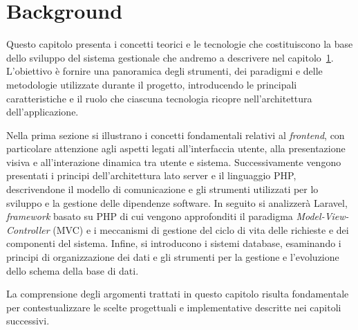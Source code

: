 \chapter{Background}
\label{ch:background}
Questo capitolo presenta i concetti teorici e le tecnologie che costituiscono la base dello sviluppo del sistema gestionale che andremo a descrivere nel capitolo~\ref{ch:background}. L'obiettivo è fornire una panoramica degli strumenti, dei paradigmi e delle metodologie utilizzate durante il progetto, introducendo le principali caratteristiche e il ruolo che ciascuna tecnologia ricopre nell'architettura dell'applicazione.

Nella prima sezione si illustrano i concetti fondamentali relativi al \textit{frontend}, con particolare attenzione agli aspetti legati all'interfaccia utente, alla presentazione visiva e all'interazione dinamica tra utente e sistema. Successivamente vengono presentati i principi dell'architettura lato server e il linguaggio PHP, descrivendone il modello di comunicazione e gli strumenti utilizzati per lo sviluppo e la gestione delle dipendenze software.
In seguito si analizzerà Laravel, \textit{framework} basato su PHP di cui vengono approfonditi il paradigma \textit{Model-View-Controller} (MVC) e i meccanismi di gestione del ciclo di vita delle richieste e dei componenti del sistema. Infine, si introducono i sistemi database, esaminando i principi di organizzazione dei dati e gli strumenti per la gestione e l'evoluzione dello schema della base di dati.

La comprensione degli argomenti trattati in questo capitolo risulta fondamentale per contestualizzare le scelte progettuali e implementative descritte nei capitoli successivi.






